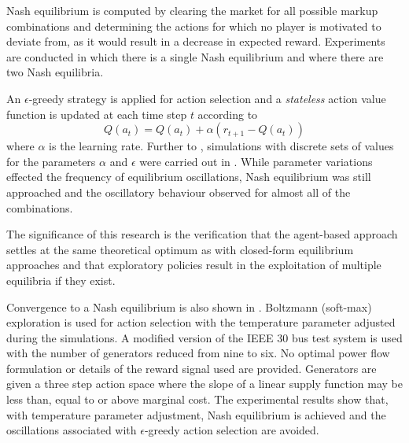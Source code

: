 Nash equilibrium is computed by clearing the market for all possible markup
combinations and determining the actions for which no player is motivated to
deviate from, as it would result in a decrease in expected reward. Experiments
are conducted in which there is a single Nash equilibrium and where there are
two Nash equilibria.

An $\epsilon$-greedy strategy \cite{suttonbarto:1998} is applied for action
selection and a \textit{stateless} action value function is updated at each time
step $t$ according to
\begin{equation}
Q(a_t) = Q(a_t) + \alpha(r_{t+1} - Q(a_t))
\end{equation}
where $\alpha$ is the learning rate.  Further to ,
simulations with discrete sets of values for the parameters $\alpha$ and
$\epsilon$ were carried out in .  While parameter
variations effected the frequency of equilibrium oscillations, Nash equilibrium
was still approached and the oscillatory behaviour observed for almost all
of the combinations.

The significance of this research is the verification that the agent-based
approach settles at the same theoretical optimum as with closed-form equilibrium
approaches and that exploratory policies result in the exploitation of multiple
equilibria if they exist.

Convergence to a Nash equilibrium is also shown in . Boltzmann
(soft-max) exploration is used for action selection with the temperature
parameter adjusted during the simulations.  A modified version of the IEEE 30
bus test system is used with the number of generators reduced from nine to six.
No optimal power flow formulation or details of the reward signal used are
provided.  Generators are given a three step action space where the slope of a
linear supply function may be less than, equal to or above marginal cost.  The
experimental results show that, with temperature parameter adjustment, Nash
equilibrium is achieved and the oscillations associated with $\epsilon$-greedy
action selection are avoided.


